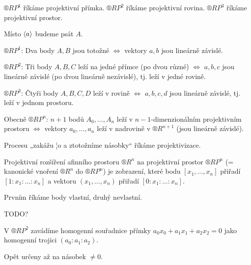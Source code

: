 \documentclass[12pt]{article}					%
\begin{document}
\begin{definice}
	$®RP^1$ říkáme projektivní přímka.
	$®RP^2$ říkáme projektivní rovina.
	$®RP^3$ říkáme projektivní prostor.
\end{definice}

\begin{poznamka}[Značení]
	Místo $\left\langle a\right\rangle$ budeme psát $A$.
\end{poznamka}

\begin{poznamka}
	$®RP^1$: Dva body $A, B$ jsou totožné $\Leftrightarrow$ vektory $a, b$ jsou lineárně závislé.

	$®RP^2$: Tři body $A, B, C$ leží na jedné přímce (po dvou různé) $\Leftrightarrow$ $a, b, c$ jsou lineárně závislé (po dvou lineárně nezávislé), tj. leží v jedné rovině.

	$®RP^3$: Čtyři body $A, B, C, D$ leží v rovině $\Leftrightarrow$ $a, b, c, d$ jsou lineárně závislé, tj. leží v jednom prostoru.

	Obecně $®RP^n$: $n+1$ bodů $A_0, …, A_n$ leží v $n-1$-dimenzionálním projektivním prostoru $\Leftrightarrow$ vektory $a_0, …, a_n$ leží v nadrovině v $®R^{n+1}$ (jsou lineárně závislé).
\end{poznamka}

\begin{poznamka}
	Procesu „zakážu ¦o a ztotožníme násobky“ říkáme projektivizace.
\end{poznamka}

\begin{definice}
	Projektivní rozšíření afinního prostoru $®R^n$ na projektivní prostor $®RP^n$ (= kanonické vnoření $®R^n$ do $®RP^n$) je zobrazení, které bodu $[x_1, …, x_n]$ přiřadí $[1:x_1:…:x_n]$ a vektoru $(x_1, …, x_n)$ přiřadí $[0:x_1:…:x_n]$.

	Prvním říkáme body vlastní, druhý nevlastní.
\end{definice}

TODO?

\begin{definice}
	V $®RP^2$ zavádíme homogenní souřadnice přímky $a_0 x_0 + a_1 x_1 + a_2 x_2 = 0$ jako homogenní trojici $(a_0:a_1:a_2)$.

	\begin{poznamkain}
		Opět určeny až na násobek $≠ 0$.
	\end{poznamkain}
\end{definice}
\end{document}
